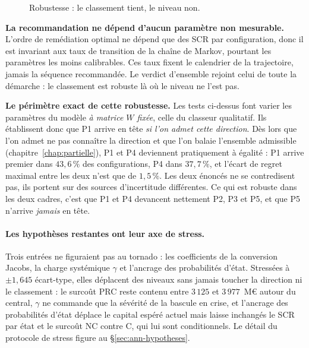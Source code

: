 \begin{figure}[htbp]\centering
{}
\caption{Robustesse : le classement tient, le niveau non.}
\label{fig:robust}
\end{figure}

\begin{cle}
\textbf{La recommandation ne dépend d'aucun paramètre non mesurable.} L'ordre de remédiation
optimal ne dépend que des SCR par configuration, donc il est invariant aux taux de
transition de la chaîne de Markov, pourtant les paramètres les moins calibrables. Ces taux
fixent le calendrier de la trajectoire, jamais la séquence recommandée. Le verdict d'ensemble
rejoint celui de toute la démarche : le classement est robuste là où le niveau ne l'est pas.
\end{cle}

\begin{attention}
\textbf{Le périmètre exact de cette robustesse.} Les tests ci-dessus font
varier les paramètres du modèle \emph{à matrice $W$ fixée}, celle du classeur qualitatif. Ils
établissent donc que P1 arrive en tête \emph{si l'on admet cette direction}. Dès lors que l'on
admet ne pas connaître la direction et que l'on balaie l'ensemble admissible
(chapitre~\ref{chap:partielle}), P1 et P4 deviennent pratiquement à égalité : P1 arrive
premier dans $43{,}6\,\%$ des configurations, P4 dans $37{,}7\,\%$, et l'écart de regret maximal entre
les deux n'est que de $1{,}5\,\%$. Les deux énoncés ne se contredisent pas, ils portent sur des
sources d'incertitude différentes. Ce qui est robuste dans les deux cadres, c'est que P1 et P4
devancent nettement P2, P3 et P5, et que P5 n'arrive \emph{jamais} en tête.
\end{attention}

\paragraph{Les hypothèses restantes ont leur axe de stress.} Trois entrées ne figuraient pas au
tornado : les coefficients de la conversion Jacobs, la charge systémique $\gamma$ et l'ancrage
des probabilités d'état. Stressées à $\pm 1{,}645$ écart-type, elles déplacent des niveaux sans
jamais toucher la direction ni le classement : le surcoût PRC reste contenu entre $3\,125$ et
$3\,977$~M\euro{} autour du central, $\gamma$ ne commande que la sévérité de la bascule en
crise, et l'ancrage des probabilités d'état déplace le capital espéré actuel mais laisse
inchangés le SCR par état et le surcoût NC contre C, qui lui sont conditionnels. Le détail du
protocole de stress figure au \S\ref{sec:ann-hypotheses}.

